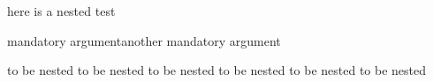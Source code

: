 here is a nested test
\begin{one}{mandatory argument}{another mandatory argument}

	to be nested to be nested
	to be nested to be nested
	to be nested to be nested
\end{one}
